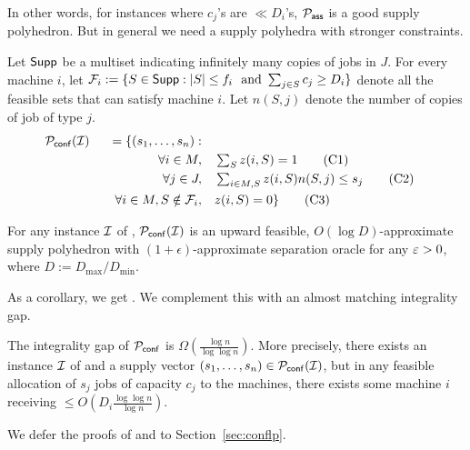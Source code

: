 \noindent
In other words, for instances where $c_j$'s are $\ll D_i$'s, ${\cal P}_\mathsf{ass}$ is a good supply polyhedron. But in general we need a supply polyhedra with stronger constraints. \smallskip

Let $\mathsf{Supp}$ be a multiset indicating infinitely many copies of jobs in $J$.
For every machine $i$, let ${\cal F}_i :=\{S\in \mathsf{Supp}: |S| \leq f_i ~\textrm{ and } \sum_{j\in S} c_j \geq D_i\}$ denote all the feasible sets that can satisfy machine $i$.
Let $n(S,j)$ denote the number of copies of job of type $j$.
\begin{alignat}{4}
	{\cal P}_\mathsf{conf}({\cal I}) && = \{(s_1,\ldots,s_n):  && \notag \\
	&& \quad \forall i \in M,   &\quad  \textstyle \sum_{S} z(i,S)  =  1 \label{eq:conflp1} \tag{C1} \\
	&& \quad \forall j\in J ,  &\quad  \textstyle \sum_{i\in M,S}  z(i,S)n(S,j) \le  s_j \label{eq:conflp2}\tag{C2} \\
	&& \quad \forall i\in M, S\notin {\cal F}_i, & \quad z(i,S)  = 0 \label{eq:conflp3} \} \tag{C3}
\end{alignat}
\begin{theorem}\label{thm:conflp}
	For any instance ${\cal I}$ of \cckp, ${\cal P}_\mathsf{conf}({\cal I})$ is an upward feasible, $O(\log D)$-approximate supply polyhedron with $(1+\epsilon)$-approximate separation oracle for any $\varepsilon > 0$,
	where $D := D_{\mathrm{max}}/D_\mathrm{min}$.
\end{theorem}
\noindent
As a corollary, we get  .
We complement this with an almost matching integrality gap.
\begin{theorem}
	\label{thm:conf-ig}
	The integrality gap of ${\cal P}_\mathsf{conf}$ is $\Omega\left(\frac{\log n}{\log\log n}\right)$. More precisely, there exists an instance ${\cal I}$ of \cckp and a supply vector $(s_1,\ldots,s_n) \in {\cal P}_\mathsf{conf}({\cal I})$, but in any feasible allocation of $s_j$ jobs of capacity $c_j$ to the machines, there exists some machine  $i$ receiving $\leq O\left( D_i\frac{\log\log n}{\log n}\right)$.
\end{theorem}
We defer the proofs of  and  to Section~\ref{sec:conflp}.
